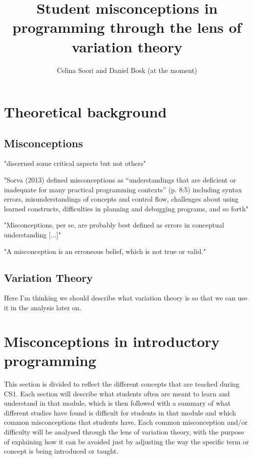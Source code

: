 \documentclass[onecolumn]{article}
\title{Student misconceptions in programming through the lens of variation 
theory}
\author{Celina Soori and Daniel Bosk (at the moment)}
\begin{document}
\maketitle
\newpage
\tableofcontents
\newpage




\section{Theoretical background}

\subsection{Misconceptions}

"discerned some critical aspects but not others" \parencite{NCOL}

"Sorva (2013) defined misconceptions as “understandings that are deficient or inadequate for many practical programming contexts” (p. 8:5) including syntax errors, misunderstandings of concepts and control flow, challenges about using learned constructs, difficulties in planning and debugging programs, and so forth" \parencite{MisconceptionsSurvey2017}

"Misconceptions, per se, are probably best defined as errors in conceptual understanding [...]" \parencite{MisconceptionsSurvey2017}

"A misconception is an erroneous belief, which is not true or valid." \parencite{KumarVeerasamy2016}

\subsection{Variation Theory}

Here I'm thinking we should describe what variation theory is so that we can use it in the analysis later on.







\section{Misconceptions in introductory programming}
\label{misconceptions}

This section is divided to reflect the different concepts that are teached during CS1. Each section will describe what students often are meant to learn and understand in that module, which is then followed with a summary of what different studies have found is difficult for students in that module and which common misconceptions that students have. Each common misconception and/or difficulty will be analysed through the lens of variation theory, with the purpose of explaining how it can be avoided just by adjusting the way the specific term or concept is being introduced or taught. 
\end{document}
